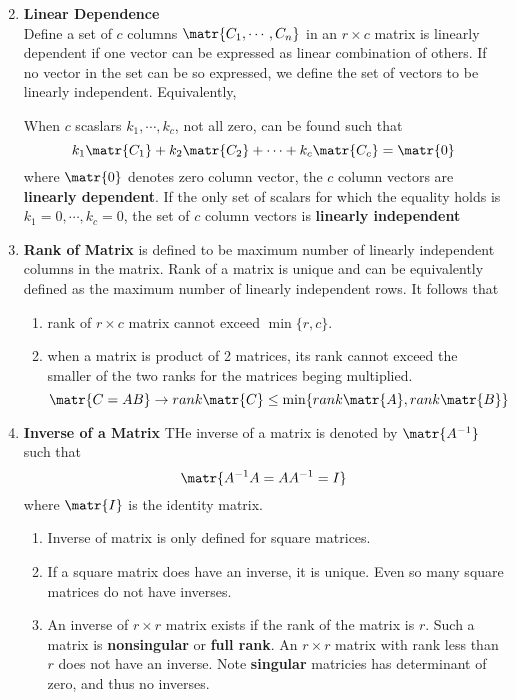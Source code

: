\documentclass[11pt]{article}
\begin{document}
\begin{defn*}
\begin{enumerate}
\begin{enumerate}
\[            \]
        \end{enumerate}
        \item \textbf{Linear Dependence} \\ 
        Define a set of $c$ columns $\matr{C_1, \cdots, C_n}$ in an $r\times c$ matrix is linearly dependent if one vector can be expressed as linear combination of others. If no vector in the set can be so expressed, we define the set of vectors to be linearly independent. Equivalently, 
        \begin{center}
            When $c$ scaslars $k_1, \cdots, k_c$, not all zero, can be found such that 
            \[
                k_1 \matr{C_1} + k_2 \matr{C_2} + \cdots + k_c \matr{C_c} = \matr{0}
            \]
            where $\matr{0}$ denotes zero column vector, the $c$ column vectors are \textbf{linearly dependent}. If the only set of scalars for which the equality holds is $k_1 = 0, \cdots, k_c = 0$, the set of $c$ column vectors is \textbf{linearly independent}
        \end{center}
        \item \textbf{Rank of Matrix} is defined to be maximum number of linearly independent columns in the matrix. Rank of a matrix is unique and can be equivalently defined as the maximum number of linearly independent rows. It follows that 
        \begin{enumerate}
            \item rank of $r\times c$ matrix cannot exceed $\min\{r, c\}$. 
            \item when a matrix is product of 2 matrices, its rank cannot exceed the smaller of the two ranks for the matrices beging multiplied.
            \[
                \matr{C=AB} \to rank\matr{C} \leq \min\{ rank\matr{A}, rank\matr{B}\}
            \]
        \end{enumerate}
        \item \textbf{Inverse of a Matrix} THe inverse of a matrix is denoted by $\matr{A^{-1}}$ such that 
        \[
            \matr{A^{-1}A = AA^{-1} = I}
        \]
        where $\matr{I}$ is the identity matrix. 
        \begin{enumerate}
            \item Inverse of matrix is only defined for square matrices.
            \item If a square matrix does have an inverse, it is unique. Even so many square matrices do not have inverses.
            \item An inverse of $r\times r$ matrix exists if the rank of the matrix is $r$. Such a matrix is \textbf{nonsingular} or \textbf{full rank}. An $r\times r$ matrix with rank less than $r$ does not have an inverse. Note \textbf{singular} matricies has determinant of zero, and thus no inverses.

\end{enumerate}
\end{enumerate}
\end{defn*}
\end{document}
